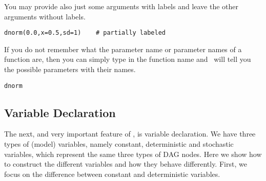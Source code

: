 You may provide also just some arguments with labels and leave the other arguments without labels.
{\tt \begin{snugshade*}
\begin{lstlisting}    
dnorm(0.0,x=0.5,sd=1)    # partially labeled
\end{lstlisting}
\end{snugshade*}}
If you do not remember what the parameter name or parameter names of a function are, then you can simply type in the function name and \RevBayes~will tell you the possible parameters with their names.
{\tt \begin{snugshade*}
\begin{lstlisting}    
dnorm
\end{lstlisting}
\end{snugshade*}}

\subsection{Variable Declaration}
The next, and very important feature of \RevBayes, is variable declaration. 
We have three types of (model) variables, namely constant, deterministic and stochastic variables, which represent the same three types of DAG nodes. 
Here we show how to construct the different variables and how they behave differently. 
First, we focus on the difference between constant and deterministic variables.

